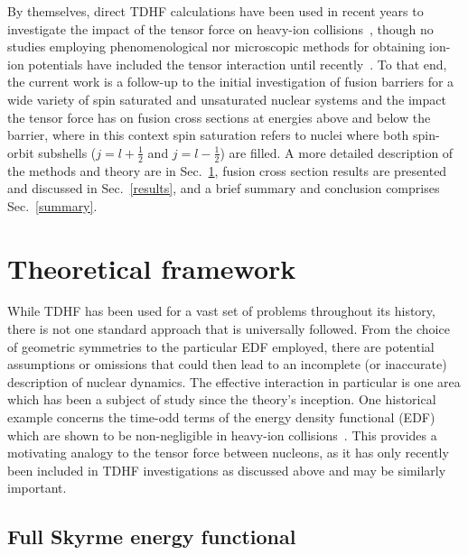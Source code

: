 By themselves, direct TDHF calculations have been used in recent years to investigate the impact of the tensor force on heavy-ion collisions~\citep{fracasso2012,dai2014a,stevenson2016,shi2017,guo2018}, though no studies employing phenomenological nor microscopic methods for obtaining ion-ion potentials have included the tensor interaction until recently~\citep{guo2018b}.
To that end, the current work is a follow-up to the initial investigation of fusion barriers for a wide variety of spin saturated and unsaturated nuclear systems and the impact the tensor force has on fusion cross sections at energies above and below the barrier, where in this context spin saturation refers to nuclei where both spin-orbit subshells ($j=l+\frac{1}{2}$ and $j=l-\frac{1}{2}$) are filled.
A more detailed description of the methods and theory are in Sec.~\ref{theory}, fusion cross section results are presented and discussed in Sec.~\ref{results}, and a brief summary and conclusion comprises Sec.~\ref{summary}. 

\section{Theoretical framework}
\label{theory}

While TDHF has been used for a vast set of problems throughout its history, there is not one standard approach that is universally followed.
From the choice of geometric symmetries to the particular EDF employed, there are potential assumptions or omissions that could then lead to an incomplete (or inaccurate) description of nuclear dynamics.
The effective interaction in particular is one area which has been a subject of study since the theory's inception.
One historical example concerns the time-odd terms of the energy density functional (EDF) which are shown to be non-negligible in heavy-ion collisions~\citep{umar2006c}.
This provides a motivating analogy to the tensor force between nucleons, as it has only recently been included in TDHF investigations as discussed above and may be similarly important.

\subsection{Full Skyrme energy functional}

